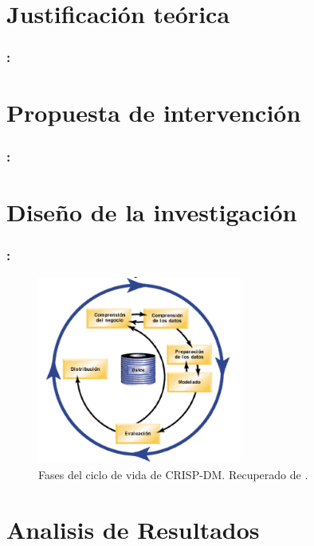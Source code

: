 \documentclass{beamer}
\begin{document}
\section{Justificación teórica}
\begin{frame}
\frametitle{\secname : \subsecname}


\end{frame}

\section{Propuesta de intervención}
\begin{frame}
\frametitle{\secname : \subsecname}


\end{frame}

\section{Diseño de la investigación}
\begin{frame}
\frametitle{\secname : \subsecname}
\begin{figure}[htb]
\centering
\caption{Fases del ciclo de vida de CRISP-DM. Recuperado de \protect{}.}
\includegraphics[width=0.6\textwidth]{../TemplateTFM/recursos/CRISPCicloIBM}
\end{figure}

\end{frame}

\section{Analisis de Resultados}
\end{document}

